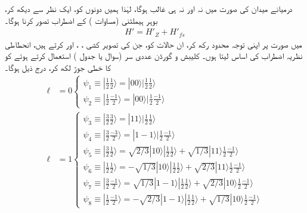 درمیانے میدان کی صورت میں نہ  اور نہ ہی  غالب ہوگا، لہٰذا ہمیں دونوں کو، ایک نظر سے دیکھ کر، بوہر ہیملٹنی (مساوات ) کے اضطراب تصور کرنا ہوگا۔
\begin{align}
H' = H'_Z + H'_{fs}
\end{align}
میں  صورت پر اپنی توجہ محدود رکھ کر، ان حالات کو، جن کی تصویر کشی ، ، اور  کرتے ہیں، انحطاطی نظریہ اضطراب کی اساس لیتا ہوں۔ کلیبش و گورڈن عددی سر (سوال  یا جدول  ) استعمال کرتے ہوئے  کو 
 کا خطی جوڑ لکھ کر، درج ذیل ہوگا۔
\begin{align*}
\ell &= 0
\begin{cases}
\psi_1 \equiv | \frac{1}{2} \frac{1}{2} \rangle = | 00 \rangle | \frac{1}{2} \frac{1}{2} \rangle \\
\psi_2 \equiv | \frac{1}{2} \frac{-1}{2} \rangle = | 00 \rangle | \frac{1}{2} \frac{-1}{2} \rangle
\end{cases} \\
\ell &= 1
\begin{cases}
\psi_3 \equiv | \frac{3}{2} \frac{3}{2} \rangle = | 11 \rangle | \frac{1}{2} \frac{1}{2} \rangle \\
\psi_4 \equiv | \frac{3}{2} \frac{-3}{2} \rangle = | 1 - 1 \rangle | \frac{1}{2} \frac{-1}{2} \rangle \\
\psi_5 \equiv | \frac{3}{2} \frac{1}{2} \rangle = \sqrt{2/3}| 10 \rangle | \frac{1}{2} \frac{1}{2} \rangle + \sqrt{1/3} | 11 \rangle \frac{1}{2} \frac{-1}{2} \rangle \\
\psi_6 \equiv | \frac{1}{2} \frac{1}{2} \rangle = - \sqrt{1/3} | 10 \rangle | \frac{1}{2} \frac{1}{2} \rangle + \sqrt{2/3} | 11 \rangle \frac{1}{2} \frac{-1}{2} \rangle \\
\psi_7 \equiv | \frac{3}{2} \frac{-1}{2} \rangle = \sqrt{1/3} | 1 - 1 \rangle | \frac{1}{2} \frac{1}{2} \rangle + \sqrt{2/3} | 10 \rangle \frac{1}{2} \frac{-1}{2} \rangle \\
\psi_8 \equiv | \frac{1}{2} \frac{-1}{2} \rangle = - \sqrt{2/3} | 1 - 1 \rangle | \frac{1}{2} \frac{1}{2} \rangle + \sqrt{1/3} | 10 \rangle \frac{1}{2} \frac{-1}{2} \rangle
\end{cases}
\end{align*}

